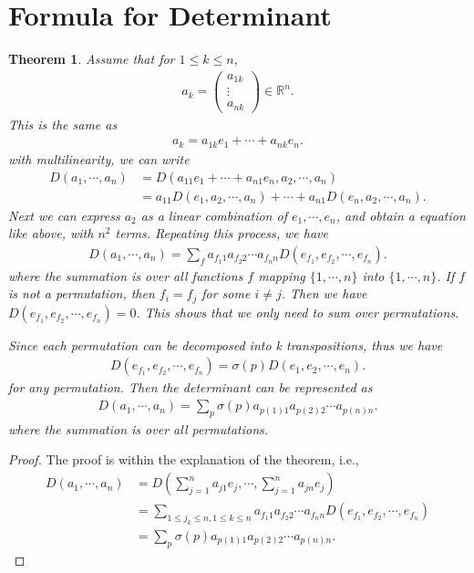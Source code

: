 \documentclass[10pt]{book}
\newtheorem{theorem}{Theorem}[chapter]
\theoremstyle{definition}
\numberwithin{equation}{chapter}
\begin{document}
\medskip

\section{Formula for Determinant}
\begin{theorem}
Assume that for $1\leq k \leq n$, 
\begin{align*}
    a_k = \left(
    \begin{matrix}
        a_{1k} \\
        \vdots \\
        a_{n k}
    \end{matrix}
    \right)\in\mathbb{R}^n.
\end{align*}
This is the same as 
\begin{align*}
    a_k = a_{1k}e_1 + \cdots + a_{nk}e_n.
\end{align*}
with multilinearity, we can write
\begin{align*}
    D(a_1,\cdots,a_n) & = D(a_{11}e_1 + \cdots + a_{n1}e_n, a_2,\cdots,a_n) \\
    & = a_{11}D(e_1,a_2,\cdots,a_n) + \cdots + a_{n1}D(e_n,a_2,\cdots,a_n).
\end{align*}
Next we can express $a_2$ as a linear combination of $e_1,\cdots,e_n$, and obtain a equation like above, with $n^2$ terms. Repeating this process, we have
\begin{align*}
    D(a_1,\cdots,a_n) = \sum_f a_{f_1 1}a_{f_2 2}\cdots a_{f_n n} D(e_{f_1}, e_{f_2},\cdots, e_{f_n}).
\end{align*}
where the summation is over all functions $f$ mapping $\{1,\cdots,n\}$ into $\{1,\cdots,n\}$. If $f$ is not a permutation, then $f_i = f_j$ for some $i\neq j$. Then we have $D(e_{f_1}, e_{f_2},\cdots, e_{f_n}) = 0$. This shows that we only need to sum over permutations.

Since each permutation can be decomposed into k transpositions, thus we have 
\begin{align*}
    D(e_{f_1}, e_{f_2},\cdots, e_{f_n}) = \sigma(p) D(e_1, e_2,\cdots, e_n).
\end{align*}
for any permutation. Then the determinant can be represented as
\begin{align*}
    D(a_1,\cdots,a_n) = \sum_p \sigma(p) a_{p(1)1} a_{p(2)2} \cdots a_{p(n)n}.
\end{align*}
where the summation is over all permutations.
\end{theorem}
\begin{proof}
The proof is within the explanation of the theorem, i.e., 
\begin{align*}
    D(a_1,\cdots,a_n) & = D\left(\sum^n_{j=1}a_{j1}e_j, \cdots, \sum^n_{j=1}a_{jn}e_j\right) \\
    & = \sum_{1\leq j_k \leq n, 1\leq k \leq n} a_{f_1 1}a_{f_2 2}\cdots a_{f_n n} D(e_{f_1}, e_{f_2},\cdots, e_{f_n}) \\
    & = \sum_p \sigma(p) a_{p(1)1} a_{p(2)2} \cdots a_{p(n)n}.
\end{align*}
\end{proof}
\end{document}
